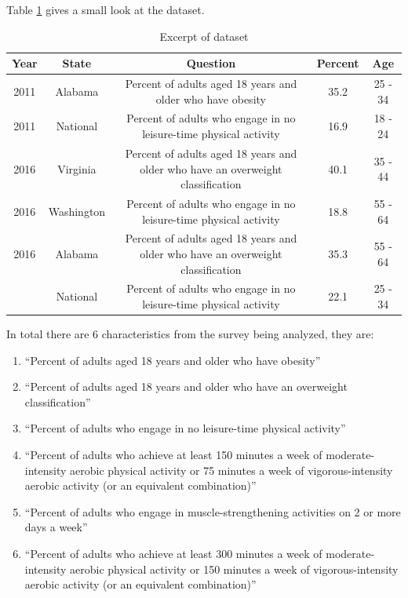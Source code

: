 \documentclass[
]{article}
\begin{document}
Table \ref{tab:tab1} gives a small look at the dataset.

\begin{table}[!h]

\caption{\label{tab:tab1}Excerpt of dataset}
\centering
\begin{tabular}[t]{ccccc}
\toprule
Year & State & Question & Percent & Age\\
\midrule
2011 & Alabama & Percent of adults aged 18 years and older who have obesity & 35.2 & 25 - 34\\
2011 & National & Percent of adults who engage in no leisure-time physical activity & 16.9 & 18 - 24\\
2016 & Virginia & Percent of adults aged 18 years and older who have an overweight classification & 40.1 & 35 - 44\\
2016 & Washington & Percent of adults who engage in no leisure-time physical activity & 18.8 & 55 - 64\\
2016 & Alabama & Percent of adults aged 18 years and older who have an overweight classification & 35.3 & 55 - 64\\
\addlinespace
2011 & National & Percent of adults who engage in no leisure-time physical activity & 22.1 & 25 - 34\\
\bottomrule
\end{tabular}
\end{table}

In total there are 6 characteristics from the survey being analyzed, they are:

\begin{enumerate}
\def\labelenumi{\arabic{enumi}.}
\item
  ``Percent of adults aged 18 years and older who have obesity''\\
\item
  ``Percent of adults aged 18 years and older who have an overweight classification''\\
\item
  ``Percent of adults who engage in no leisure-time physical activity''\\
\item
  ``Percent of adults who achieve at least 150 minutes a week of moderate-intensity aerobic physical activity or 75 minutes a week of vigorous-intensity aerobic activity (or an equivalent combination)''
\item
  ``Percent of adults who engage in muscle-strengthening activities on 2 or more days a week''\\
\item
  ``Percent of adults who achieve at least 300 minutes a week of moderate-intensity aerobic physical activity or 150 minutes a week of vigorous-intensity aerobic activity (or an equivalent combination)''
\end{enumerate}
\end{document}
